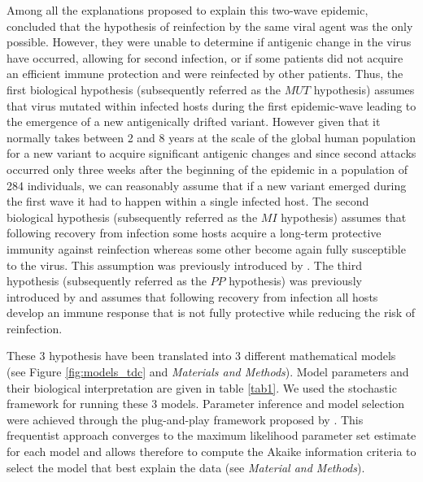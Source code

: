 Among all the explanations proposed to explain this two-wave epidemic,
\citet{Mantle1973} concluded that the hypothesis of reinfection by the
same viral agent was the only possible. However, they were unable to
determine if antigenic change in the virus have occurred, allowing for
second infection, or if some patients did not acquire an efficient
immune protection and were reinfected by other patients.
%
%
Thus, the first biological hypothesis (subsequently referred as the
$MUT$ hypothesis) assumes that virus mutated within infected hosts
during the first epidemic-wave leading to the emergence of a new
antigenically drifted variant. However given that it normally takes
between 2 and 8 years at the scale of the global human population for
a new variant to acquire significant antigenic changes
\citep{Smith2004,Koelle2006} and since second attacks occurred only
three weeks after the beginning of the epidemic in a population of 284
individuals, we can reasonably assume that if a new variant emerged
during the first wave it had to happen within a single infected host.
The second biological hypothesis (subsequently referred as the $MI$
hypothesis) assumes that following recovery from infection some hosts
acquire a long-term protective immunity against reinfection whereas
some other become again fully susceptible to the virus. This
assumption was previously introduced by \citet{Mathews2007}. The third
hypothesis (subsequently referred as the $PP$ hypothesis) was
previously introduced by \citet{Gomes2004} and assumes that following
recovery from infection all hosts develop an immune response that is
not fully protective while reducing the risk of reinfection.

These 3 hypothesis have been translated into 3 different mathematical
models (see Figure \ref{fig:models_tdc} and \textsl{Materials and
  Methods}). Model parameters and their biological interpretation are
given in table \ref{tab1}. We used the stochastic framework for
running these 3 models. Parameter inference and model selection were
achieved through the plug-and-play framework proposed by
\citet{Ionides2006}. This frequentist approach converges to the maximum
likelihood parameter set estimate for each model and allows therefore
to compute the Akaike information criteria to select the model that
best explain the data (see \textsl{Material and Methods}).

